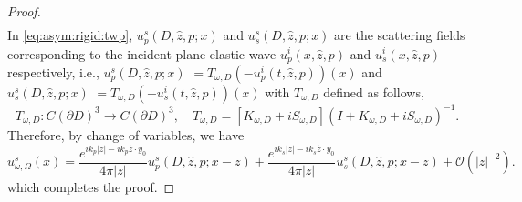 \documentclass[a4paper,11pt]{article}
\newcommand{\mO}{\mathcal{O}}
\newtheorem{corollary}{Corollary}[section]
\theoremstyle{remark}
\newtheorem{remark}{Remark}[section]
\theoremstyle{definition}
\numberwithin{equation}{section}
\begin{document}
\begin{proof}
\begin{align}
   \end{align}
In \eqref{eq:asym:rigid:twp}, $u_{p}^s(D,\hat{z},p;x)$ and $u_{s}^s(D,\hat{z},p;x)$ are the scattering fields corresponding to the incident plane elastic wave $u_{p}^i(x, \hat{z}, p)$ and $u_{s}^i(x,\hat{z},p)$ respectively, i.e., $u_{p}^s(D,\hat{z},p;x)$ $= T_{\omega,D}(- u_{p}^{i}(t,\hat{z},p))(x)$ and $u_{s}^s(D,\hat{z},p;x)$ $= T_{\omega,D}(-u_{s}^{i}(t,\hat{z},p))(x)$ with $T_{\omega,D}$  defined as follows,
    \[
    T_{\omega,D} : C(\partial D)^3 \rightarrow C(\partial D)^3, \quad T_{\omega,D} = [K_{\omega,D} + iS_{\omega,D}]  (I + K_{\omega,D} + i S_{\omega,D})^{-1}.
    \]
Therefore, by change of variables, we have
   \begin{equation}
   u_{\omega,\Omega}^s(x) =  \frac{e^{ik_p|z|-ik_p\hat{z} \cdot y_0}}{4 \pi |z|}u_{p}^s(D,\hat{z},p;x-z) + \frac{e^{ik_s|z|-ik_s\hat{z} \cdot y_0}}{4 \pi |z|}u_{s}^s(D,\hat{z},p;x-z)+ \mathcal{O}(|z|^{-2}). \label{eq:asym:rigid:twoo}
   \end{equation}
   which completes the proof.

 \end{proof}

\end{document}
